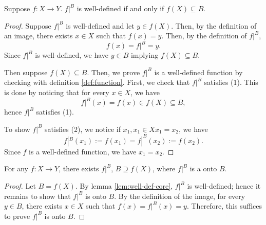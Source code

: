 \begin{lemma}
	Suppose $f:X\to Y$.
	$f|^B$ is well-defined if and only if $f(X)\subseteq B$.
	\label{lem:well-def-core}
\end{lemma}
\begin{proof}
	Suppose $f|^B$ is well-defined and let $y\in f(X)$.
	Then, by the definition of an image, there exists $x\in X$ such that $f(x)=y$. Then, by the definition of $f|^B$,
	$$f(x)=f|^B=y.$$
	Since $f|^B$ is well-defined, we have $y\in B$ implying $f(X)\subseteq B$.
	
	Then suppose $f(X)\subseteq B$. Then, we prove $f|^B$ is a well-defined function by checking with definition \eqref{def:function}.
	First, we check that $f|^B$ satisfies (1). This is done by noticing that for every $x\in X$, we have
	$$f|^B(x)=f(x)\in f(X)\subseteq B,$$
	hence $f|^B$ satisfies (1).
	
	To show $f|^B$ satisfies (2), we notice if $x_1,x_1\in X$$x_1=x_2$, we have
	$$f|^B(x_1):=f(x_1)=f|^B(x_2):=f(x_2).$$
	Since $f$ is a well-defined function, we have $x_1=x_2$.
\end{proof}


\begin{lemma}
For any $f:X\to Y$, there exists $f|^B$, $B\supseteq f(X)$, where $f|^B$ is a onto $B$.
\label{lem:co-onto}
\end{lemma}
\begin{proof}
	Let $B=f(X)$. By lemma \eqref{lem:well-def-core}, $f|^B$ is well-defined; hence it remains to show that $f|^B$ is onto $B$.
	By the definition of the image, for every $y\in B$, there exists $x\in X$ such that $f(x)=f|^B(x)=y$.
	Therefore, this suffices to prove $f|^B$ is onto $B$.
\end{proof}

